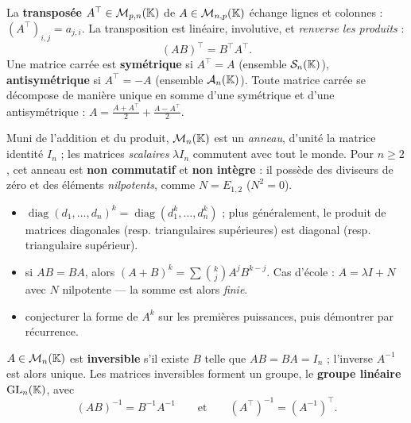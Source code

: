 
\begin{definition}
La \textbf{transposée} $A^{\top}\in\mathcal{M}_{p,n}(\mathbb{K})$ de
$A\in\mathcal{M}_{n,p}(\mathbb{K})$ échange lignes et colonnes :
$(A^{\top})_{i,j}=a_{j,i}$. La transposition est linéaire, involutive, et
\emph{renverse les produits} :
\[
  (AB)^{\top}=B^{\top}A^{\top}.
\]
Une matrice carrée est \textbf{symétrique} si $A^{\top}=A$ (ensemble
$\mathcal{S}_n(\mathbb{K})$), \textbf{antisymétrique} si $A^{\top}=-A$ (ensemble
$\mathcal{A}_n(\mathbb{K})$). Toute matrice carrée se décompose de manière unique
en somme d'une symétrique et d'une antisymétrique :
$A=\frac{A+A^{\top}}{2}+\frac{A-A^{\top}}{2}$.
\end{definition}


\begin{theoreme}
Muni de l'addition et du produit, $\mathcal{M}_n(\mathbb{K})$ est un \emph{anneau},
d'unité la matrice identité $I_n$ ; les matrices \emph{scalaires}
$\lambda I_n$ commutent avec tout le monde. Pour $n\geq2$, cet anneau est
\textbf{non commutatif} et \textbf{non intègre} : il possède des diviseurs
de zéro et des éléments \emph{nilpotents}, comme
$N=E_{1,2}$ ($N^{2}=0$).
\end{theoreme}

\begin{savoirfaire}
\begin{itemize}[label={\color{otGreenDark}\textbullet},leftmargin=1.4em,itemsep=0.6mm,topsep=0.5mm]
  \item {} $\operatorname{diag}(d_1,\dots,d_n)^{k}
    =\operatorname{diag}(d_1^{k},\dots,d_n^{k})$ ; plus généralement, le
    produit de matrices diagonales (resp. triangulaires supérieures) est
    diagonal (resp. triangulaire supérieur).
  \item {} si $AB=BA$, alors
    $(A+B)^{k}=\sum\binom{k}{j}A^{j}B^{k-j}$. Cas d'école : $A=\lambda I+N$
    avec $N$ nilpotente — la somme est alors \emph{finie}.
  \item {} conjecturer la forme de $A^{k}$ sur les
    premières puissances, puis démontrer par récurrence.
\end{itemize}
\end{savoirfaire}


\begin{definition}
$A\in\mathcal{M}_n(\mathbb{K})$ est \textbf{inversible} s'il existe $B$ telle que
$AB=BA=I_n$ ; l'inverse $A^{-1}$ est alors unique. Les matrices
inversibles forment un groupe, le \textbf{groupe linéaire}
$\mathrm{GL}_n(\mathbb{K})$, avec
\[
  (AB)^{-1}=B^{-1}A^{-1}
  \qquad\text{et}\qquad
  (A^{\top})^{-1}=(A^{-1})^{\top}.
\]
\end{definition}

